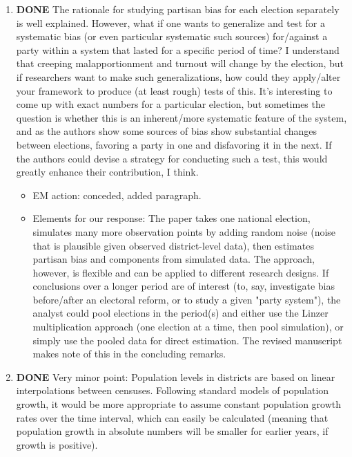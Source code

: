 \documentclass{article}
\begin{document}
\begin{enumerate}
\begin{itemize}
\end{itemize}
\item {\bfseries\sffamily DONE} The rationale for studying partisan bias for each election separately is well explained. However, what if one wants to generalize and test for a systematic bias (or even particular systematic such sources) for/against a party within a system that lasted for a specific period of time? I understand that creeping malapportionment and turnout will change by the election, but if researchers want to make such generalizations, how could they apply/alter your framework to produce (at least rough) tests of this. It's interesting to come up with exact numbers for a particular election, but sometimes the question is whether this is an inherent/more systematic feature of the system, and as the authors show some sources of bias show substantial changes between elections, favoring a party in one and disfavoring it in the next. If the authors could devise a strategy for conducting such a test, this would greatly enhance their contribution, I think.
\label{sec:orgheadline12}
\begin{itemize}
\item EM action: conceded, added paragraph.
\item Elements for our response: The paper takes one national election, simulates many more observation points by adding random noise (noise that is plausible given observed district-level data), then estimates partisan bias and components from simulated data. The approach, however, is flexible and can be applied to different research designs. If conclusions over a longer period are of interest (to, say, investigate bias before/after an electoral reform, or to study a given "party system"), the analyst could pool elections in the period(s) and either use the Linzer multiplication approach (one election at a time, then pool simulation), or simply use the pooled data for direct estimation. The revised manuscript makes note of this in the concluding remarks.
\end{itemize}
\item {\bfseries\sffamily DONE} Very minor point: Population levels in districts are based on linear interpolations between censuses. Following standard models of population growth, it would be more appropriate to assume constant population growth rates over the time interval, which can easily be calculated (meaning that population growth in absolute numbers will be smaller for earlier years, if growth is positive).
\label{sec:orgheadline13}
\begin{itemize}

\end{itemize}
\end{enumerate}
\end{document}
